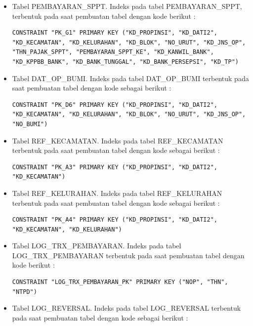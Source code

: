 \documentclass[pdftex,12pt, oneside]{article}
\begin{document}
\begin{enumerate}[1.]
\begin{itemize}
	  \item Tabel PEMBAYARAN\_SPPT. Indeks pada tabel PEMBAYARAN\_SPPT, terbentuk pada saat pembuatan tabel dengan kode berikut :
	  
\begin{lstlisting}
CONSTRAINT "PK_G1" PRIMARY KEY ("KD_PROPINSI", "KD_DATI2", "KD_KECAMATAN", "KD_KELURAHAN", "KD_BLOK", "NO_URUT", "KD_JNS_OP", "THN_PAJAK_SPPT", "PEMBAYARAN_SPPT_KE", "KD_KANWIL_BANK", "KD_KPPBB_BANK", "KD_BANK_TUNGGAL", "KD_BANK_PERSEPSI", "KD_TP")
\end{lstlisting}

	  \item Tabel DAT\_OP\_BUMI. Indeks pada tabel DAT\_OP\_BUMI terbentuk pada saat pembuatan tabel dengan kode sebagai berikut :
	  
\begin{lstlisting}
CONSTRAINT "PK_D6" PRIMARY KEY ("KD_PROPINSI", "KD_DATI2", "KD_KECAMATAN", "KD_KELURAHAN", "KD_BLOK", "NO_URUT", "KD_JNS_OP", "NO_BUMI")
\end{lstlisting}
	  
	  \item Tabel REF\_KECAMATAN. Indeks pada tabel REF\_KECAMATAN terbentuk pada saat pembuatan tabel dengan kode sebagai berikut :
	  
\begin{lstlisting}
CONSTRAINT "PK_A3" PRIMARY KEY ("KD_PROPINSI", "KD_DATI2", "KD_KECAMATAN")
\end{lstlisting}
	  
	  \item Tabel REF\_KELURAHAN. Indeks pada tabel REF\_KELURAHAN terbentuk pada saat pembuatan tabel dengan kode sebagai berikut :
	  
\begin{lstlisting}
CONSTRAINT "PK_A4" PRIMARY KEY ("KD_PROPINSI", "KD_DATI2", "KD_KECAMATAN", "KD_KELURAHAN")
\end{lstlisting}
	  
	  \item Tabel LOG\_TRX\_PEMBAYARAN. Indeks pada tabel LOG\_TRX\_PEMBAYARAN terbentuk pada saat pembuatan tabel dengan kode berikut :
	  
\begin{lstlisting}
CONSTRAINT "LOG_TRX_PEMBAYARAN_PK" PRIMARY KEY ("NOP", "THN", "NTPD")
\end{lstlisting}
	  
	  \item Tabel LOG\_REVERSAL. Indeks pada tabel LOG\_REVERSAL terbentuk pada saat pembuatan tabel dengan kode sebagai berikut :
	  

\end{itemize}
\end{enumerate}
\end{document}
